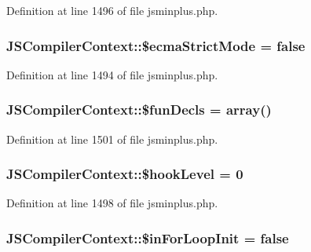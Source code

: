 Definition at line 1496 of file jsminplus.\+php.

\hypertarget{classJSCompilerContext_aa3f054dfbdebeefaa80fed265846d4bb}{
\subsubsection[{\$ecma\+Strict\+Mode}]{\setlength{\rightskip}{0pt plus 5cm}J\+S\+Compiler\+Context\+::\$ecma\+Strict\+Mode = false}}\label{classJSCompilerContext_aa3f054dfbdebeefaa80fed265846d4bb}


Definition at line 1494 of file jsminplus.\+php.

\hypertarget{classJSCompilerContext_a79d313ac507c757ff7ed6f3a6cd86fb7}{
\subsubsection[{\$fun\+Decls}]{\setlength{\rightskip}{0pt plus 5cm}J\+S\+Compiler\+Context\+::\$fun\+Decls = array()}}\label{classJSCompilerContext_a79d313ac507c757ff7ed6f3a6cd86fb7}


Definition at line 1501 of file jsminplus.\+php.

\hypertarget{classJSCompilerContext_a54d411f75337b5e12ff88dc15ab8874d}{
\subsubsection[{\$hook\+Level}]{\setlength{\rightskip}{0pt plus 5cm}J\+S\+Compiler\+Context\+::\$hook\+Level = 0}}\label{classJSCompilerContext_a54d411f75337b5e12ff88dc15ab8874d}


Definition at line 1498 of file jsminplus.\+php.

\hypertarget{classJSCompilerContext_acd4955dc8f8a30c87fd5457f946dc270}{
\subsubsection[{\$in\+For\+Loop\+Init}]{\setlength{\rightskip}{0pt plus 5cm}J\+S\+Compiler\+Context\+::\$in\+For\+Loop\+Init = false}}\label{classJSCompilerContext_acd4955dc8f8a30c87fd5457f946dc270}



